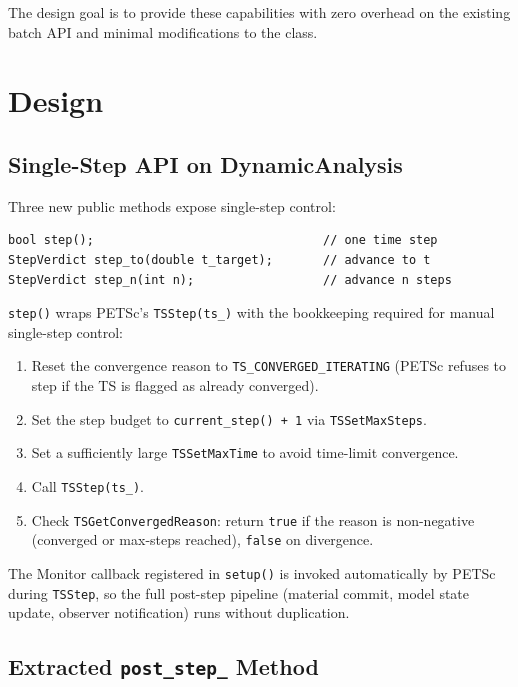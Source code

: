 The design goal is to provide these capabilities with zero overhead on the
existing batch API and minimal modifications to the class.

\section{Design}
\label{sec:sd-design}

\subsection{Single-Step API on DynamicAnalysis}

Three new public methods expose single-step control:

\begin{lstlisting}
bool step();                                // one time step
StepVerdict step_to(double t_target);       // advance to t
StepVerdict step_n(int n);                  // advance n steps
\end{lstlisting}

\noindent
\texttt{step()} wraps PETSc's \texttt{TSStep(ts\_)} with the bookkeeping
required for manual single-step control:

\begin{enumerate}
  \item Reset the convergence reason to \verb|TS_CONVERGED_ITERATING|
        (PETSc refuses to step if the TS is flagged as already converged).
  \item Set the step budget to \verb|current_step() + 1| via
        \verb|TSSetMaxSteps|.
  \item Set a sufficiently large \verb|TSSetMaxTime| to avoid
        time-limit convergence.
  \item Call \verb|TSStep(ts_)|.
  \item Check \verb|TSGetConvergedReason|: return \texttt{true} if
        the reason is non-negative (converged or max-steps reached),
        \texttt{false} on divergence.
\end{enumerate}

The Monitor callback registered in \texttt{setup()} is invoked
automatically by PETSc during \texttt{TSStep}, so the full post-step
pipeline (material commit, model state update, observer notification)
runs without duplication.

\subsection{Extracted \texttt{post\_step\_} Method}

